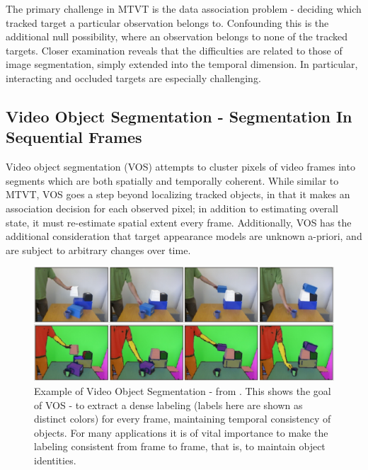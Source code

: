 The primary challenge in MTVT is the data association problem - deciding which tracked target a particular observation belongs to. Confounding this is the additional null possibility, where an observation belongs to none of the tracked targets. Closer examination reveals that the difficulties are related to those of image segmentation, simply extended into the temporal dimension. In particular, interacting and occluded targets are especially challenging.

\subsection{Video Object Segmentation - Segmentation In Sequential Frames}
Video object segmentation (VOS) attempts to cluster pixels of video frames into segments which are both spatially and temporally coherent. While similar to MTVT, VOS goes a step beyond localizing tracked objects, in that it makes an association decision for each observed pixel; in addition to estimating overall state, it must re-estimate spatial extent every frame. Additionally, VOS has the additional consideration that target appearance models are unknown a-priori, and are subject to arbitrary changes over time. 

\begin{figure}
\label{fig:ExampleSegmentation}
\centering
\includegraphics[width=\linewidth]{figures/Introduction/Video_Segmentation.pdf}
\caption[Example of Video Object Segmentation]{Example of Video Object Segmentation - from \cite{Abramov_WACV12}. This shows the goal of VOS - to extract a dense labeling (labels here are shown as distinct colors) for every frame, maintaining temporal consistency of objects. For many applications it is of vital importance to make the labeling consistent from frame to frame, that is, to maintain object identities.}
\end{figure}

